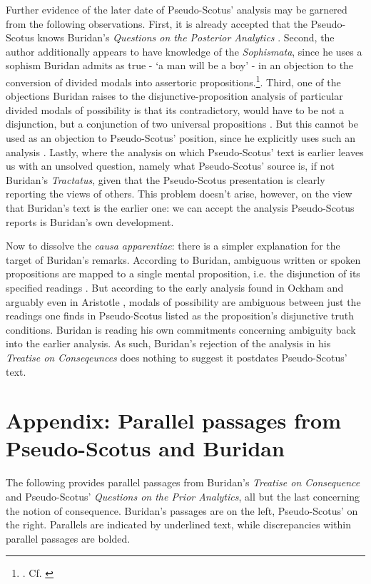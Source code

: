 \documentclass[]{article}
\begin{document}
Further evidence of the later date of Pseudo-Scotus' analysis may be garnered from the following observations. First, it is already accepted that the Pseudo-Scotus knows Buridan's \textit{Questions on the Posterior Analytics} \cite[pp. 4-5]{Read2015}. Second, the author additionally appears to have knowledge of the \textit{Sophismata}, since he uses a sophism Buridan admits as true - `a man will be a boy' - in an objection to the conversion of divided modals into assertoric propositions.\footnote{\cite[in. anal. pr. I, q. 26, p. 143]{Pseudo-Scotus1891}. Cf. \cite[pp. 878, 888]{BuridanKlimaSD}}. Third, one of the objections Buridan raises to the disjunctive-proposition analysis of particular divided modals of possibility is that its contradictory, would have to be not a disjunction, but a conjunction of two universal propositions \cite[TC II, 4, p. 98]{Buridan2015}. But this cannot be used as an objection to Pseudo-Scotus' position, since he explicitly uses such an analysis \cite[in anal. pr. q. 26, p. 144]{Pseudo-Scotus1891}. Lastly, where the analysis on which Pseudo-Scotus' text is earlier leaves us with an unsolved question, namely what Pseudo-Scotus' source is, if not Buridan's \textit{Tractatus}, given that the Pseudo-Scotus presentation is clearly reporting the views of others. This problem doesn't arise, however, on the view that Buridan's text is the earlier one: we can accept the analysis Pseudo-Scotus reports is Buridan's own development.

Now to dissolve the \textit{causa apparentiae}: there is a simpler explanation for the target of Buridan's remarks. According to Buridan, ambiguous written or spoken propositions are mapped to a single mental proposition, i.e. the disjunction of its specified readings \cite[QE 3.2]{BuridanQE}. But according to the early analysis found in Ockham \cite[SL II, ch. 25]{OckhamSLI} \cite{PriestRead1981} and arguably even in Aristotle \cite[Pr. An. 19, 32B 25-32]{AristotlePrA} \cite[pp. 243-245]{Johnston2015}, modals of possibility are ambiguous between just the readings one finds in Pseudo-Scotus listed as the proposition's disjunctive truth conditions. Buridan is reading his own commitments concerning ambiguity back into the earlier analysis. As such, Buridan's rejection of the analysis in his \textit{Treatise on Conseqeunces} does nothing to suggest it postdates Pseudo-Scotus' text.




\section{Appendix: Parallel passages from Pseudo-Scotus and Buridan}
The following provides parallel passages from Buridan's \textit{Treatise on Consequence} and Pseudo-Scotus' \textit{Questions on the Prior Analytics}, all but the last concerning the notion of consequence. Buridan's passages are on the left, Pseudo-Scotus' on the right. Parallels are indicated by underlined text, while discrepancies within parallel passages are bolded.
\end{document}
